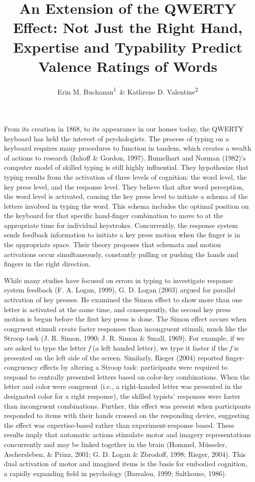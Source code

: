 \documentclass[english,man]{apa6}
\title{An Extension of the QWERTY Effect: Not Just the Right Hand, Expertise
and Typability Predict Valence Ratings of Words}
\author{Erin M. Buchanan\textsuperscript{1}~\& Kathrene D. Valentine\textsuperscript{2}}
\affiliation{
    \vspace{0.5cm}
          \textsuperscript{1} Missouri State University\\
          \textsuperscript{2} University of Missouri  }
\theoremstyle{definition}
\theoremstyle{definition}
\theoremstyle{definition}
\theoremstyle{remark}
\begin{document}
\maketitle

\setcounter{secnumdepth}{0}



From its creation in 1868, to its appearance in our homes today, the
QWERTY keyboard has held the interest of psychologists. The process of
typing on a keyboard requires many procedures to function in tandem,
which creates a wealth of actions to research (Inhoff \& Gordon, 1997).
Rumelhart and Norman (1982)'s computer model of skilled typing is still
highly influential. They hypothesize that typing results from the
activation of three levels of cognition: the word level, the key press
level, and the response level. They believe that after word perception,
the word level is activated, causing the key press level to initiate a
schema of the letters involved in typing the word. This schema includes
the optimal position on the keyboard for that specific hand-finger
combination to move to at the appropriate time for individual
keystrokes. Concurrently, the response system sends feedback information
to initiate a key press motion when the finger is in the appropriate
space. Their theory proposes that schemata and motion activations occur
simultaneously, constantly pulling or pushing the hands and fingers in
the right direction.

While many studies have focused on errors in typing to investigate
response system feedback (F. A. Logan, 1999), G. D. Logan (2003) argued
for parallel activation of key presses. He examined the Simon effect to
show more than one letter is activated at the same time, and
consequently, the second key press motion is begun before the first key
press is done. The Simon effect occurs when congruent stimuli create
faster responses than incongruent stimuli, much like the Stroop task (J.
R. Simon, 1990; J. R. Simon \& Small, 1969). For example, if we are
asked to type the letter \emph{f} (a left handed letter), we type it
faster if the \emph{f} is presented on the left side of the screen.
Similarly, Rieger (2004) reported finger-congruency effects by altering
a Stroop task: participants were required to respond to centrally
presented letters based on color-key combinations. When the letter and
color were congruent (i.e., a right-handed letter was presented in the
designated color for a right response), the skilled typists' responses
were faster than incongruent combinations. Further, this effect was
present when participants responded to items with their hands crossed on
the responding device, suggesting the effect was expertise-based rather
than experiment-response based. These results imply that automatic
actions stimulate motor and imagery representations concurrently and may
be linked together in the brain (Hommel, Müsseler, Aschersleben, \&
Prinz, 2001; G. D. Logan \& Zbrodoff, 1998; Rieger, 2004). This dual
activation of motor and imagined items is the basis for embodied
cognition, a rapidly expanding field in psychology (Barsalou, 1999;
Salthouse, 1986).
\end{document}

